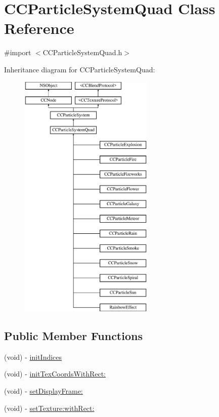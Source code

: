 \hypertarget{interface_c_c_particle_system_quad}{\section{C\-C\-Particle\-System\-Quad Class Reference}
\label{interface_c_c_particle_system_quad}
}


{\ttfamily \#import $<$C\-C\-Particle\-System\-Quad.\-h$>$}

Inheritance diagram for C\-C\-Particle\-System\-Quad\-:\begin{figure}[H]
\begin{center}
\leavevmode
\includegraphics[height=12.000000cm]{interface_c_c_particle_system_quad}
\end{center}
\end{figure}
\subsection*{Public Member Functions}
\begin{DoxyCompactItemize}
\item 
(void) -\/ \hyperlink{interface_c_c_particle_system_quad_ae8d4fe470607470d0f0940d44c03c420}{init\-Indices}
\item 
(void) -\/ \hyperlink{interface_c_c_particle_system_quad_adbca33e15ef011dfb00896921023022f}{init\-Tex\-Coords\-With\-Rect\-:}
\item 
(void) -\/ \hyperlink{interface_c_c_particle_system_quad_adde96b4648de168d11e4ff2b4192ab98}{set\-Display\-Frame\-:}
\item 
(void) -\/ \hyperlink{interface_c_c_particle_system_quad_a52cd3ecffa7df445cc2b7d9ac2fc22bc}{set\-Texture\-:with\-Rect\-:}
\end{DoxyCompactItemize}
